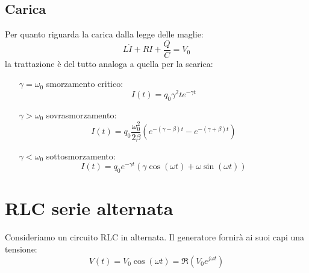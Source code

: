 \subsection{Carica}
Per quanto riguarda la carica dalla legge delle maglie:
\begin{equation}
  L\dot I+RI+\frac{Q}{C}=V_0
\end{equation}
la trattazione è del tutto analoga a quella per la scarica:
\begin{itemize}
  \item[$\gamma=\omega_0$] smorzamento critico:
    \begin{equation}
      I(t)=q_0\gamma^2te^{-\gamma t}
    \end{equation}
  \item[$\gamma>\omega_0$] sovrasmorzamento:
    \begin{equation}
      I(t)=q_0\frac{\omega_0^2}{2\beta}\left(e^{-(\gamma-\beta)t}-e^{-(\gamma+\beta)t}\right)
    \end{equation}
  \item[$\gamma<\omega_0$] sottosmorzamento:
    \begin{equation}
      I(t)=q_0e^{-\gamma t}\left(\gamma\cos(\omega t)+\omega\sin(\omega t)\right)
    \end{equation}
\end{itemize}




\section{RLC serie alternata}
Consideriamo un circuito RLC in alternata. Il generatore fornirà ai suoi capi una tensione:
\begin{equation}
  V(t)=V_0\cos\left(\omega t\right)=\Re(V_0 e^{j\omega t})
\end{equation}
